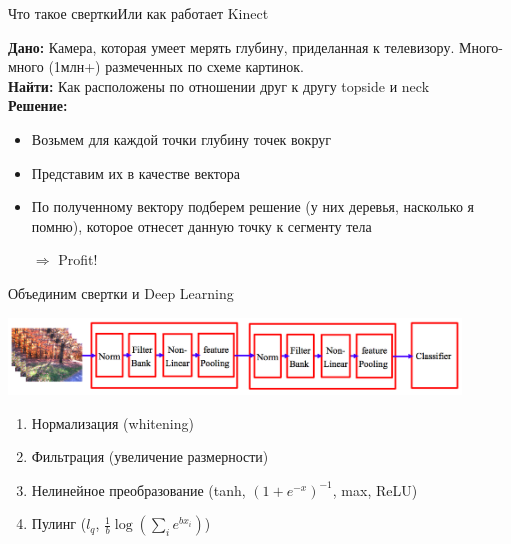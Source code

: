 \documentclass[14pt, fleqn, xcolor={dvipsnames, table}]{beamer}
\begin{document}
\begin{frame}{Что такое свертки}{Или как работает Kinect}
 {
\textbf{Дано:} Камера, которая умеет мерять глубину, приделанная к телевизору. Много-много (1млн+) размеченных по схеме картинок.\\
\textbf{Найти:} Как расположены по отношении друг к другу topside и neck\\
\textbf{Решение:}\small
\begin{itemize}
\item Возьмем для каждой точки глубину точек вокруг
\item Представим их в качестве вектора
\item По полученному вектору подберем решение (у них деревья, насколько я помню), которое отнесет данную точку к сегменту тела
\item[$\Rightarrow$] Profit!
\end{itemize}
}
\end{frame}

\begin{frame}{Объединим свертки и Deep Learning}
\begin{center}
\includegraphics[width=0.9\textwidth]{convolution-scheme.png}
\end{center}
\begin{enumerate}\small
  \item Нормализация (whitening)
  \item Фильтрация (увеличение размерности)
  \item Нелинейное преобразование (tanh, $(1 + e^{-x})^{-1}$, max, ReLU)
  \item Пулинг ($l_q$, $\frac{1}{b}\log\left(\sum_i e^{b x_i}\right)$)
\end{enumerate}
\end{frame}
\end{document}
